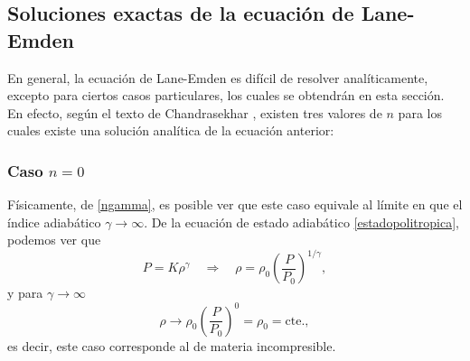 
\subsection{Soluciones exactas de la ecuación de Lane-Emden}\label{sec:exactas}
En general, la ecuación de Lane-Emden es difícil de resolver analíticamente, excepto para ciertos casos particulares, los cuales se obtendrán en esta sección. En efecto, según el texto de Chandrasekhar \cite{Chandra39}, existen tres valores de $n$ para los cuales existe una solución analítica de la ecuación anterior:

\subsubsection{Caso \texorpdfstring{$n=0$}{n0}}

Físicamente, de \eqref{ngamma}, es posible ver que este caso equivale al límite en que el índice adiabático $\gamma\to\infty$. De la ecuación de estado adiabático \eqref{estadopolitropica}, podemos ver que
\begin{equation}
 P=K\rho^{\gamma}\quad\Rightarrow\quad \rho=\rho_0\left(\frac{P}{P_0}\right)^{1/\gamma},
\end{equation}
y para $\gamma\to\infty$
\begin{equation}
 \rho\to\rho_0\left(\frac{P}{P_0}\right)^{0}=\rho_0=\text{cte.},
\end{equation}
es decir, este caso corresponde al de materia incompresible.

